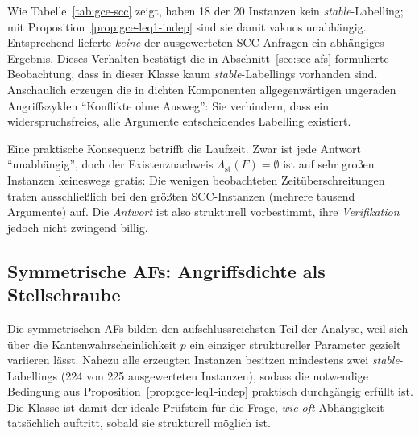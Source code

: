 Wie Tabelle~\ref{tab:gce-scc} zeigt, haben 18 der 20 Instanzen kein
\textit{stable}-Labelling; mit Proposition~\ref{prop:gce-leq1-indep} sind sie
damit vakuos unabh\"angig. Entsprechend lieferte \emph{keine} der
ausgewerteten SCC-Anfragen ein abh\"angiges Ergebnis. Dieses Verhalten
best\"atigt die in Abschnitt~\ref{sec:scc-afs} formulierte Beobachtung, dass in
dieser Klasse kaum \textit{stable}-Labellings vorhanden sind. Anschaulich
erzeugen die in dichten Komponenten allgegenw\"artigen ungeraden Angriffszyklen
\enquote{Konflikte ohne Ausweg}: Sie verhindern, dass ein widerspruchsfreies,
alle Argumente entscheidendes Labelling existiert.

Eine praktische Konsequenz betrifft die Laufzeit. Zwar ist jede Antwort
\enquote{unabh\"angig}, doch der Existenznachweis
\(\Lambda_{\mathrm{st}}(F)=\emptyset\) ist auf sehr gro\ss en Instanzen
keineswegs gratis: Die wenigen beobachteten Zeit\"uberschreitungen traten
ausschlie\ss lich bei den gr\"o\ss ten SCC-Instanzen (mehrere tausend
Argumente) auf. Die \emph{Antwort} ist also strukturell vorbestimmt, ihre
\emph{Verifikation} jedoch nicht zwingend billig.

\subsection{Symmetrische AFs: Angriffsdichte als Stellschraube}
\label{subsec:gce-sym}

Die symmetrischen AFs bilden den aufschlussreichsten Teil der Analyse, weil
sich \"uber die Kantenwahrscheinlichkeit \(p\) ein einziger struktureller
Parameter gezielt variieren l\"asst. Nahezu alle erzeugten Instanzen besitzen
mindestens zwei \textit{stable}-Labellings (224 von 225 ausgewerteten
Instanzen), sodass die notwendige Bedingung aus
Proposition~\ref{prop:gce-leq1-indep} praktisch durchg\"angig erf\"ullt ist.
Die Klasse ist damit der ideale Pr\"ufstein f\"ur die Frage, \emph{wie oft}
Abh\"angigkeit tats\"achlich auftritt, sobald sie strukturell m\"oglich ist.

